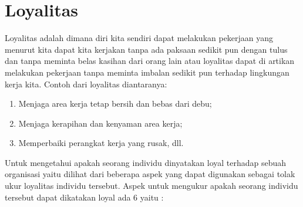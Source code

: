 \section{Loyalitas}
Loyalitas adalah dimana diri kita sendiri dapat melakukan pekerjaan yang menurut kita dapat kita kerjakan tanpa ada paksaan sedikit pun
dengan tulus dan tanpa meminta belas kasihan dari orang lain atau loyalitas dapat di artikan melakukan pekerjaan tanpa meminta imbalan sedikit pun terhadap lingkungan kerja kita.
Contoh dari loyalitas diantaranya:
\begin{enumerate}
\item Menjaga area kerja tetap bersih dan bebas dari debu;
\item Menjaga kerapihan dan kenyaman area kerja;
\item Memperbaiki perangkat kerja yang rusak, dll.
\end{enumerate}
Untuk mengetahui apakah seorang individu dinyatakan loyal terhadap sebuah organisasi yaitu dilihat dari beberapa aspek yang dapat digunakan sebagai tolak ukur loyalitas individu tersebut. Aspek untuk mengukur apakah seorang individu tersebut dapat dikatakan loyal ada 6 yaitu :
